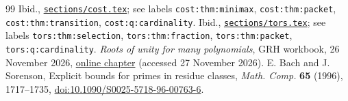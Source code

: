 \documentclass[11pt]{article}
\theoremstyle{remark}\newtheorem{remark}[theorem]{Remark}
\newcommand{\code}[1]{\texttt{#1}}
\begin{document}
\begin{thebibliography}{99}
 Ibid., \href{https://github.com/VladimirReshetnikov/ProveIt/blob/main/Analysis/GeneralizedRiemannHypothesis/Article/sections/cost.tex}{\texttt{sections/cost.tex}}; see labels \code{cost:thm:minimax}, \code{cost:thm:packet}, \code{cost:thm:transition}, \code{cost:q:cardinality}.
 Ibid., \href{https://github.com/VladimirReshetnikov/ProveIt/blob/main/Analysis/GeneralizedRiemannHypothesis/Article/sections/tors.tex}{\texttt{sections/tors.tex}}; see labels \code{tors:thm:selection}, \code{tors:thm:fraction}, \code{tors:thm:packet}, \code{tors:q:cardinality}.
 \emph{Roots of unity for many polynomials}, GRH workbook, 26 November 2026, \href{https://ultronozm.github.io/grh-workbook/20261126T040300--roots-of-unity-for-many-polynomials__workbook.html}{online chapter} (accessed 27 November 2026).
 E. Bach and J. Sorenson, Explicit bounds for primes in residue classes, \emph{Math. Comp.} \textbf{65} (1996), 1717--1735, \href{https://doi.org/10.1090/S0025-5718-96-00763-6}{doi:10.1090/S0025-5718-96-00763-6}.
\end{thebibliography}
\end{document}

